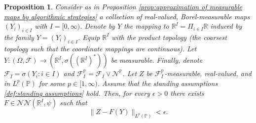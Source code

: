 \documentclass[11pt,a4paper,twoside,openany]{report}
\numberwithin{equation}{section}
\theoremstyle{plain} %
\newtheorem{proposition}[theorem]{Proposition}
\theoremstyle{definition} %
\theoremstyle{remark} %
\begin{document}
\begin{proposition}\label{prop:reduction to countably generated sigma algebra is not fundamental, product topology}
    Consider as in Proposition \ref{prop:approximation of measurable maps by algorithmic strategies} a collection of real-valued, Borel-measurable maps \((Y_{i})_{i\in I}\) with \(I=[0,\infty)\). Denote by \(Y\) the mapping to \(\mathbb{R}^I=\Pi_{i\in I}\mathbb{R}\) induced by the family \(Y=(Y_i)_{i\in I}\). Equip \(\mathbb{R}^I\) with the product topology (the coarsest topology such that the coordinate mappings are continuous). Let \(Y:(\Omega,\mathcal{F})\to (\mathbb{R}^I,\sigma((\mathbb{R}^I)^*))\) be measurable. Finally, denote \(\mathcal{F}_I=\sigma(Y_i:i\in I)\) and \(\mathcal{F}_I^{\mathbb{P}}=\mathcal{F}_I\vee\mathcal{N}^{\mathbb{P}}\). Let \(Z\) be \(\mathcal{F}_I^{\mathbb{P}}\)-measurable, real-valued, and in \(L^p(\mathbb{P})\) for some \(p\in[1,\infty)\). Assume that the standing assumptions \ref{def:standing assumptions} hold. Then, for every \(\epsilon>0\) there exists \(F\in\mathcal{NN}(\mathbb{R}^I,\psi)\) such that 
    \begin{equation*}
        \lVert Z-F(Y)\rVert_{L^p(\mathbb{P})}<\epsilon.
    \end{equation*}
\end{proposition}
\end{document}
